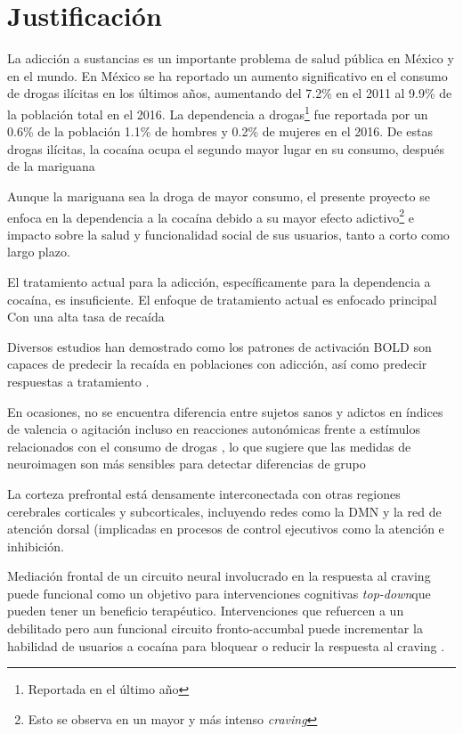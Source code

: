 \section{Justificación}
La adicción a sustancias es un importante problema de salud pública en México y en el mundo.
En México se ha reportado un aumento significativo en el consumo de drogas ilícitas en los últimos años, aumentando del 7.2\% en el 2011 al 9.9\% de la población total en el 2016.
La dependencia a drogas\footnote{Reportada en el último año} fue reportada por un 0.6\% de la población \textemdash{}1.1\% de hombres y 0.2\% de mujeres en el 2016.
De estas drogas ilícitas, la cocaína ocupa el segundo mayor lugar en su consumo, después de la mariguana \parencite{Villatoro-Velazques2017}\par
Aunque la mariguana sea la droga de mayor consumo, el presente proyecto se enfoca en la dependencia a la cocaína debido a su mayor efecto adictivo\footnote{Esto se observa en un mayor y más intenso \textit{craving}} e impacto sobre la salud y funcionalidad social de sus usuarios, tanto a corto como largo plazo. \par
El tratamiento actual para la adicción, específicamente para la dependencia a cocaína, es insuficiente. El enfoque de tratamiento actual es enfocado principal Con una alta tasa de recaída \parencite{McLellan2010a}





Diversos estudios han demostrado como los patrones de activación BOLD son capaces de predecir la recaída en poblaciones con adicción, así como predecir respuestas a tratamiento \parencite{Suckling2017}.

En ocasiones, no se encuentra diferencia entre sujetos sanos y adictos en índices de valencia o agitación \textemdash{}incluso en reacciones autonómicas\textemdash{} frente a estímulos relacionados con el consumo de drogas \parencite{Goldstein2012a}, lo que sugiere que las medidas de neuroimagen son más sensibles para detectar diferencias de grupo


La corteza prefrontal está densamente interconectada con otras regiones cerebrales corticales y subcorticales, incluyendo redes como la DMN y la red de atención dorsal (implicadas en procesos de control ejecutivos como la atención e inhibición\parencite{Goldstein2012a}.

Mediación frontal de un circuito neural involucrado en la respuesta al craving puede funcional como un objetivo para intervenciones cognitivas \textit{top-down}que pueden tener un beneficio terapéutico. Intervenciones que refuercen a un debilitado pero aun funcional circuito fronto-accumbal puede incrementar la habilidad de usuarios a cocaína para bloquear o reducir la respuesta al craving \parencite{Volkow2010a}.
